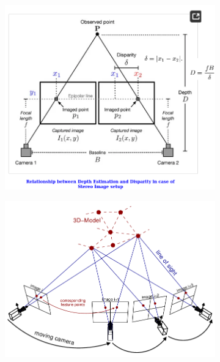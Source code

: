 \begin{figure}[htbp]
    \centering
    \begin{subfigure}[b]{0.18\textwidth}
        \includegraphics[width=\textwidth]{images/methodology/depth_estimation_a.png}
        \caption{}
        \label{fig:depth_estimation_a}
    \end{subfigure}
    \hfill
    \begin{subfigure}[b]{0.18\textwidth}
        \includegraphics[width=\textwidth]{images/methodology/depth_estimation_b.png}
        \caption{}
        \label{fig:depth_estimation_b}
    \end{subfigure}

\end{figure}
